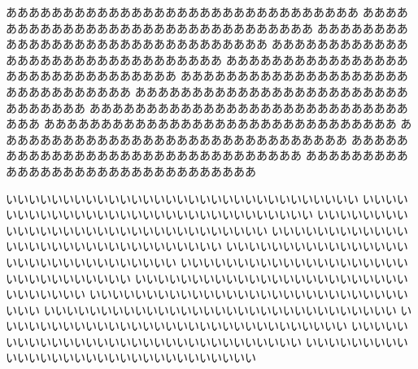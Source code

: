 \begin{breakRline}[fboxsep=10pt]
%
あああああああああああああああああああああああああああああああ
あああああああああああああああああああああああああああああああ
あああああああああああああああああああああああああああああああ
あああああああああああああああああああああああああああああああ
あああああああああああああああああああああああああああああああ
あああああああああああああああああああああああああああああああ
あああああああああああああああああああああああああああああああ
あああああああああああああああああああああああああああああああ
あああああああああああああああああああああああああああああああ
あああああああああああああああああああああああああああああああ
あああああああああああああああああああああああああああああああ
あああああああああああああああああああああああああああああああ

いいいいいいいいいいいいいいいいいいいいいいいいいいいいいいい
いいいいいいいいいいいいいいいいいいいいいいいいいいいいいいい
いいいいいいいいいいいいいいいいいいいいいいいいいいいいいいい
いいいいいいいいいいいいいいいいいいいいいいいいいいいいいいい
いいいいいいいいいいいいいいいいいいいいいいいいいいいいいいい
いいいいいいいいいいいいいいいいいいいいいいいいいいいいいいい
いいいいいいいいいいいいいいいいいいいいいいいいいいいいいいい
いいいいいいいいいいいいいいいいいいいいいいいいいいいいいいい
いいいいいいいいいいいいいいいいいいいいいいいいいいいいいいい
いいいいいいいいいいいいいいいいいいいいいいいいいいいいいいい
いいいいいいいいいいいいいいいいいいいいいいいいいいいいいいい
いいいいいいいいいいいいいいいいいいいいいいいいいいいいいいい


\end{breakRline}
